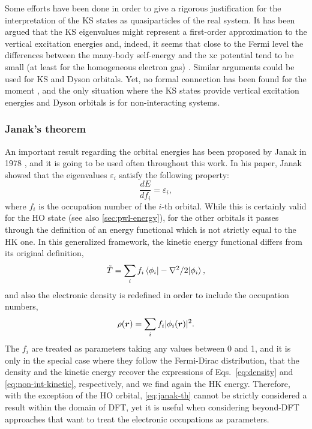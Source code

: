 Some efforts have been done in order to give a rigorous justification for the interpretation of the KS states as quasiparticles of the real system. It has been argued that the KS eigenvalues might represent a first-order approximation to the vertical excitation energies \cite{chong_interpretation_2002} and, indeed, it seems that close to the Fermi level the differences between the many-body self-energy and the xc potential tend to be small (at least for the homogeneous electron gas) \cite{jones_density_1989}. Similar arguments could be used for KS and Dyson orbitals. Yet, no formal connection has been found for the moment \cite{di_valentin_gas-phase_2014}, and the only situation where the KS states provide vertical excitation energies and Dyson orbitals is for non-interacting systems.

\subsubsection*{Janak's theorem}
An important result regarding the orbital energies has been proposed by Janak in 1978 \cite{janak_proof_1978_corrected}, and it is going to be used often throughout this work. In his paper, Janak showed that the eigenvalues $\varepsilon_i$ satisfy the following property:
%
\begin{equation}
    \frac{dE}{df_i} = \varepsilon_i ,
    \label{eq:janak-th}
\end{equation}
%
where $f_i$ is the occupation number of the $i$-th orbital. While this is certainly valid for the HO state (see also \cref{sec:pwl-energy}), for the other orbitals it passes through the definition of an energy functional which is not strictly equal to the HK one. In this generalized framework, the kinetic energy functional differs from its original definition,
%
\begin{equation}
    \Tilde{T} = \sum_i f_i \braket{\phi_i| -\nabla^2/2 |\phi_i} ,
    \label{eq:janak-kinetic}
\end{equation}
%
and also the electronic density is redefined in order to include the occupation numbers,
%
\begin{equation}
    \rho({\bm r}) = \sum_i f_i |\phi_i({\bm r})|^2 .
    \label{eq:janak-density}
\end{equation}
%
The $f_i$ are treated as parameters taking any values between 0 and 1, and it is only in the special case where they follow the Fermi-Dirac distribution, that the density and the kinetic energy recover the expressions of Eqs.~\eqref{eq:density} and \eqref{eq:non-int-kinetic}, respectively, and we find again the HK energy. Therefore, with the exception of the HO orbital, \cref{eq:janak-th} cannot be strictly considered a result within the domain of DFT, yet it is useful when considering beyond-DFT approaches that want to treat the electronic occupations as parameters.

